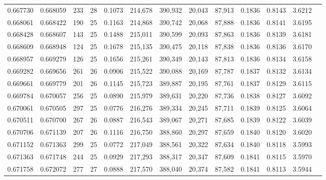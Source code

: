 \begin{tabular}{rrrrrrrrrrrrr}
0.667730 & 0.668059 &   233 &  28 &                                     0.1073 & 214,678 & 390,932 &  20,043 &  87,913 & 0.1836 & 0.8143 & 3.6212 \\
0.668061 & 0.668422 &   190 &  25 &                                     0.1163 & 214,868 & 390,742 &  20,068 &  87,888 & 0.1836 & 0.8141 & 3.6195 \\
0.668428 & 0.668607 &   143 &  25 &                                     0.1488 & 215,011 & 390,599 &  20,093 &  87,863 & 0.1836 & 0.8139 & 3.6181 \\
0.668609 & 0.668948 &   124 &  25 &                                     0.1678 & 215,135 & 390,475 &  20,118 &  87,838 & 0.1836 & 0.8136 & 3.6170 \\
0.668957 & 0.669279 &   126 &  25 &                                     0.1656 & 215,261 & 390,349 &  20,143 &  87,813 & 0.1836 & 0.8134 & 3.6158 \\
0.669282 & 0.669656 &   261 &  26 &                                     0.0906 & 215,522 & 390,088 &  20,169 &  87,787 & 0.1837 & 0.8132 & 3.6134 \\
0.669661 & 0.669779 &   201 &  26 &                                     0.1145 & 215,723 & 389,887 &  20,195 &  87,761 & 0.1837 & 0.8129 & 3.6115 \\
0.669784 & 0.670057 &   256 &  25 &                                     0.0890 & 215,979 & 389,631 &  20,220 &  87,736 & 0.1838 & 0.8127 & 3.6092 \\
0.670061 & 0.670505 &   297 &  25 &                                     0.0776 & 216,276 & 389,334 &  20,245 &  87,711 & 0.1839 & 0.8125 & 3.6064 \\
0.670511 & 0.670700 &   267 &  26 &                                     0.0887 & 216,543 & 389,067 &  20,271 &  87,685 & 0.1839 & 0.8122 & 3.6039 \\
0.670706 & 0.671139 &   207 &  26 &                                     0.1116 & 216,750 & 388,860 &  20,297 &  87,659 & 0.1840 & 0.8120 & 3.6020 \\
0.671152 & 0.671363 &   299 &  25 &                                     0.0772 & 217,049 & 388,561 &  20,322 &  87,634 & 0.1840 & 0.8118 & 3.5993 \\
0.671363 & 0.671748 &   244 &  25 &                                     0.0929 & 217,293 & 388,317 &  20,347 &  87,609 & 0.1841 & 0.8115 & 3.5970 \\
0.671758 & 0.672072 &   277 &  27 &                                     0.0888 & 217,570 & 388,040 &  20,374 &  87,582 & 0.1841 & 0.8113 & 3.5944 \\

\end{tabular}
